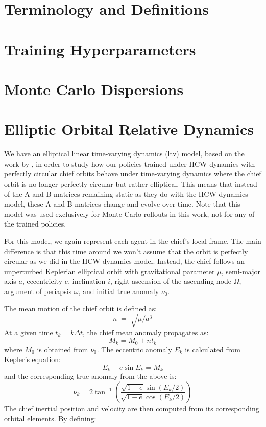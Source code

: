 \chapter{Terminology and Definitions}
\label{appendix:glossary}



\chapter{Training Hyperparameters}
\label{appendix:hyperparameters}



\chapter{Monte Carlo Dispersions}
\label{appendix:dispersions}




\chapter{Elliptic Orbital Relative Dynamics}
\label{appendix:dynamics-elliptic-ltv}

We have an elliptical linear time-varying dynamics (\acs{ltv}) model, based on the work by \cite{tschauner1965rendezvous}, in order to study how our policies trained under HCW dynamics with perfectly circular chief orbits behave under time-varying dynamics where the chief orbit is no longer perfectly circular but rather elliptical. This means that instead of the A and B matrices remaining static as they do with the HCW dynamics model, these A and B matrices change and evolve over time. Note that this model was used exclusively for Monte Carlo rollouts in this work, not for any of the trained policies.

For this model, we again represent each agent in the chief's local frame. The main difference is that this time around we won't assume that the orbit is perfectly circular as we did in the HCW dynamics model. Instead, the chief follows an unperturbed Keplerian elliptical orbit with gravitational parameter $\mu$, semi-major axis $a$, eccentricity $e$, inclination $i$, right ascension of the ascending node $\Omega$, argument of periapsis $\omega$, and initial true anomaly $\nu_0$. 


The mean motion of the chief orbit is defined as:
\[
n \;=\; \sqrt{\mu/a^3}
\]
At a given time $t_k = k\Delta t$, the chief mean anomaly propagates as:
\[
M_k = M_0 + nt_k
\]
where $M_0$ is obtained from $\nu_0$. The eccentric anomaly $E_k$ is calculated from Kepler's equation:
\[
E_k - e\sin E_k = M_k
\]
and the corresponding true anomaly from the above is:
\[
\nu_k
=
2 \tan^{-1}
\left(
\frac{\sqrt{1+e}\sin(E_k/2)}
     {\sqrt{1-e}\cos(E_k/2)}
\right)
\]
The chief inertial position and velocity are then computed from its corresponding orbital elements. By defining:


